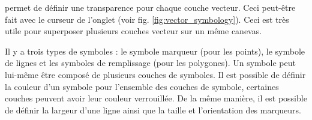  \label{sec:vect_transparency} 

\qg permet de définir une transparence pour chaque couche vecteur. Ceci peut-être fait avec le curseur  de l'onglet  (voir fig. \ref{fig:vector_symbology}). Ceci est très utile pour superposer plusieurs couches vecteur sur un même canevas.


Il y a trois types de symboles : le symbole marqueur (pour les points), le symbole de lignes et les symboles de remplissage (pour les polygones). Un symbole peut lui-même être composé de plusieurs couches de symboles. Il est possible de définir la couleur d'un symbole pour l'ensemble des couches de symbole, certaines couches peuvent avoir leur couleur verrouillée. De la même manière, il est possible de définir la largeur d'une ligne ainsi que la taille et l'orientation des marqueurs.


